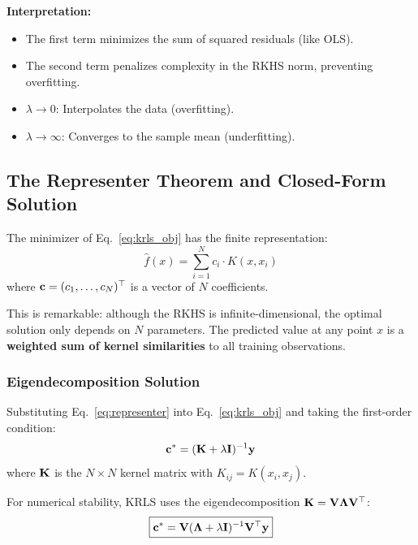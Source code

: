 \textbf{Interpretation:}
\begin{itemize}[leftmargin=2em]
\item The first term minimizes the sum of squared residuals (like OLS).
\item The second term penalizes complexity in the RKHS norm, preventing overfitting.
\item $\lambda \to 0$: Interpolates the data (overfitting).
\item $\lambda \to \infty$: Converges to the sample mean (underfitting).
\end{itemize}

\subsection{The Representer Theorem and Closed-Form Solution}

\begin{theorembox}
The minimizer of Eq.~\eqref{eq:krls_obj} has the finite representation:
\begin{equation}
\hat{f}(x) = \sum_{i=1}^{N} c_i \cdot K(x, x_i)
\label{eq:representer}
\end{equation}
where $\mathbf{c} = (c_1, \ldots, c_N)^\top$ is a vector of $N$ coefficients.
\end{theorembox}

This is remarkable: although the RKHS is infinite-dimensional, the optimal solution only depends on $N$ parameters. The predicted value at any point $x$ is a \textbf{weighted sum of kernel similarities} to all training observations.

\subsubsection{Eigendecomposition Solution}

Substituting Eq.~\eqref{eq:representer} into Eq.~\eqref{eq:krls_obj} and taking the first-order condition:
\begin{equation}
\mathbf{c}^* = (\mathbf{K} + \lambda \mathbf{I})^{-1} \mathbf{y}
\label{eq:coef_basic}
\end{equation}
where $\mathbf{K}$ is the $N \times N$ kernel matrix with $K_{ij} = K(x_i, x_j)$.

For numerical stability, KRLS uses the eigendecomposition $\mathbf{K} = \mathbf{V} \boldsymbol{\Lambda} \mathbf{V}^\top$:
\begin{equation}
\boxed{\mathbf{c}^* = \mathbf{V} (\boldsymbol{\Lambda} + \lambda \mathbf{I})^{-1} \mathbf{V}^\top \mathbf{y}}
\label{eq:coef_eigen}
\end{equation}

